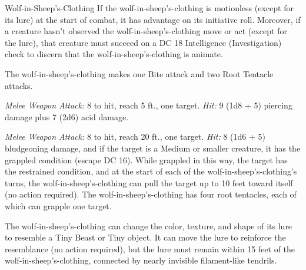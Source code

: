 \documentclass[10pt,a4paper,twoside,bg=print,twocolumn,openany,nodeprecatedcode]{dndbook}
\begin{document}
\begin{DndMonster}[float=t]{Wolf-in-Sheep's-Clothing}
\DndMonsterBasics[
armor-class = {16 (natural armor)},
hit-points = {\DndDice{15d8 + 45}},
speed = {20 ft., climb 20 ft.}
]
\DndMonsterAbilityScores[
 str = 20,
 dex = 9,
 con = 16,
 int = 5,
 wis = 12,
 cha = 5
]
\DndMonsterDetails[
skills = {Perception +7, Stealth +5},
condition-immunities = {prone},
senses = {darkvision 60 ft., passive perception 17},
challenge = 7,
]
If the wolf-in-sheep's-clothing is motionless (except for its lure) at the start of combat, it has advantage on its initiative roll. Moreover, if a creature hasn't observed the wolf-in-sheep's-clothing move or act (except for the lure), that creature must succeed on a DC 18 Intelligence (Investigation) check to discern that the wolf-in-sheep's-clothing is animate.

The wolf-in-sheep's-clothing makes one Bite attack and two Root Tentacle attacks.

\textsl{Melee Weapon Attack:} 8 to hit, reach 5 ft., one target. \textsl{Hit:} 9 (1d8 + 5) piercing damage plus 7 (2d6) acid damage.

\textsl{Melee Weapon Attack:} 8 to hit, reach 20 ft., one target. \textsl{Hit:} 8 (1d6 + 5) bludgeoning damage, and if the target is a Medium or smaller creature, it has the grappled condition (escape DC 16). While grappled in this way, the target has the restrained condition, and at the start of each of the wolf-in-sheep's-clothing's turns, the wolf-in-sheep's-clothing can pull the target up to 10 feet toward itself (no action required). The wolf-in-sheep's-clothing has four root tentacles, each of which can grapple one target.

The wolf-in-sheep's-clothing can change the color, texture, and shape of its lure to resemble a Tiny Beast or Tiny object. It can move the lure to reinforce the resemblance (no action required), but the lure must remain within 15 feet of the wolf-in-sheep's-clothing, connected by nearly invisible filament-like tendrils.

\end{DndMonster}
\end{document}
